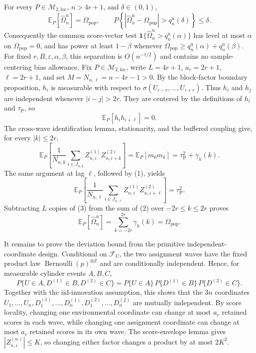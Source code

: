 For every \(P\in\mathcal M_{2,\mathrm{loc}}\), \(n>4r+1\), and \(\delta\in(0,1)\),
\[
 \mathbb E_P[\widehat\Omega_n^{\mathrm u}]=\Omega_{\mathrm{pop}},
 \qquad
 P\!\left\{\left|\widehat\Omega_n^{\mathrm u}-\Omega_{\mathrm{pop}}\right|>
 q_n^{\mathrm u}(\delta)\right\}\le\delta.
\]
Consequently the common score-vector test
\(\mathbf 1\{\widehat\Omega_n^{\mathrm u}>q_n^{\mathrm u}(\alpha)\}\)
has level at most \(\alpha\) on \(\Omega_{\mathrm{pop}}=0\), and has power at least
\(1-\beta\) whenever
\(\Omega_{\mathrm{pop}}\ge q_n^{\mathrm u}(\alpha)+q_n^{\mathrm u}(\beta)\).
For fixed \(r,B,\varepsilon,\alpha,\beta\), this separation is \(O(n^{-1/2})\) and contains no sample-centering bias allowance.
Fix \(P\in\mathcal M_{2,\mathrm{loc}}\), write \(L=4r+1\), \(a_r=2r+1\), \(\ell=2r+1\), and set \(M=N_{n,\ell}=n-4r-1>0\).  By the block-factor boundary proposition, \(h_i\) is measurable with respect to \(\sigma(U_{i-r},\ldots,U_{i+r})\).  Thus \(h_i\) and \(h_j\) are independent whenever \(|i-j|>2r\).  They are centered by the definitions of \(h_i\) and \(\tau_{\mathrm P}\), so
\[
 \mathbb E_P[h_i h_{i+\ell}]=0. \tag{1}
\]
The cross-wave identification lemma, stationarity, and the buffered coupling give, for every \(|k|\le2r\),
\[
 \mathbb E_P\!\left[
 \frac1{N_{n,k}}\sum_{i\in J_{n,k}}Z_{n,i}^{(1)}Z_{n,i+k}^{(2)}
 \right]
 =\mathbb E_P[m_0m_k]
 =\tau_{\mathrm P}^2+\gamma_h(k). \tag{2}
\]
The same argument at lag \(\ell\), followed by (1), yields
\[
 \mathbb E_P\!\left[
 \frac1{N_{n,\ell}}\sum_{i\in J_{n,\ell}}Z_{n,i}^{(1)}Z_{n,i+\ell}^{(2)}
 \right]=\tau_{\mathrm P}^2. \tag{3}
\]
Subtracting \(L\) copies of (3) from the sum of (2) over \(-2r\le k\le2r\) proves
\[
 \mathbb E_P[\widehat\Omega_n^{\mathrm u}]
 =\sum_{k=-2r}^{2r}\gamma_h(k)=\Omega_{\mathrm{pop}}. \tag{4}
\]

It remains to prove the deviation bound from the primitive independent-coordinate design.  Conditional on \(\mathcal F_U\), the two assignment waves have the fixed product law \(\operatorname{Bernoulli}(p)^{\otimes\mathbb Z}\) and are conditionally independent.  Hence, for measurable cylinder events \(A,B,C\),
\[
 P\{U\in A,D^{(1)}\in B,D^{(2)}\in C\}
 =P\{U\in A\}\,P\{D^{(1)}\in B\}\,P\{D^{(2)}\in C\}.
\]
Together with the iid-innovation assumption, this shows that the \(3n\) coordinates
\(U_1,\ldots,U_n,D_1^{(1)},\ldots,D_n^{(1)},D_1^{(2)},\ldots,D_n^{(2)}\)
are mutually independent.  By score locality, changing one environmental coordinate can change at most \(a_r\) retained scores in each wave, while changing one assignment coordinate can change at most \(a_r\) retained scores in its own wave.  The score-envelope lemma gives \(|Z_{n,i}^{(w)}|\le K\), so changing either factor changes a product by at most \(2K^2\).

